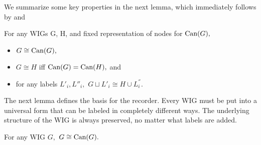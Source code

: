 We summarize some key properties in the next lemma, which immediately follows by \label{def:iso} and \label{lemma:closure}

\begin{lemma}
  For any WIGs G, H, and fixed representation of nodes for $\textrm{Can}(G),$
  \begin{itemize}
    \item $G \cong \textrm{Can}(G),$
    \item $G \cong H$ iff $\textrm{Can}(G) = \textrm{Can}(H),$ and
    \item for any labels $L'_{i}, L''_{i},$ $G \sqcup L'_{i} \cong H \cup L^{''}_{i}.$
  \end{itemize}
\end{lemma}

The next lemma defines the basis for the recorder. Every WIG must be put into a universal form that can be labeled in completely different ways. The underlying structure of the WIG is always preserved, no matter what labels are added.
\begin{lemma} For any WIG $G,$ $G \cong \textrm{Can}(G).$
\end{lemma}



